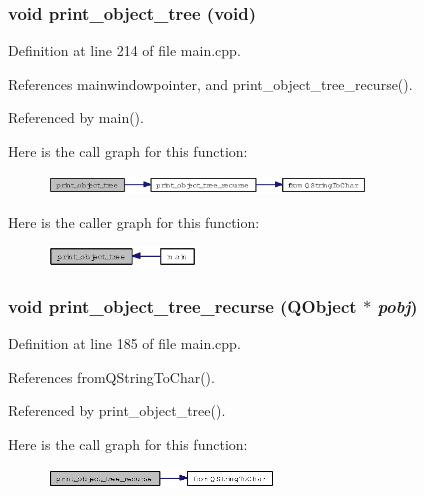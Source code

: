 \subsubsection{\setlength{\rightskip}{0pt plus 5cm}void print\_\-object\_\-tree (void)}\label{main_8cpp_8ff96661921f7c09201747e09d034951}




Definition at line 214 of file main.cpp.

References mainwindowpointer, and print\_\-object\_\-tree\_\-recurse().

Referenced by main().

Here is the call graph for this function:\begin{figure}[H]
\begin{center}
\leavevmode
\includegraphics[width=239pt]{main_8cpp_8ff96661921f7c09201747e09d034951_cgraph}
\end{center}
\end{figure}


Here is the caller graph for this function:\begin{figure}[H]
\begin{center}
\leavevmode
\includegraphics[width=112pt]{main_8cpp_8ff96661921f7c09201747e09d034951_icgraph}
\end{center}
\end{figure}
\subsubsection{\setlength{\rightskip}{0pt plus 5cm}void print\_\-object\_\-tree\_\-recurse (QObject $\ast$ {\em pobj})}\label{main_8cpp_571c71b2c6270a13685be239f6f91311}




Definition at line 185 of file main.cpp.

References from\-QString\-To\-Char().

Referenced by print\_\-object\_\-tree().

Here is the call graph for this function:\begin{figure}[H]
\begin{center}
\leavevmode
\includegraphics[width=170pt]{main_8cpp_571c71b2c6270a13685be239f6f91311_cgraph}
\end{center}
\end{figure}


